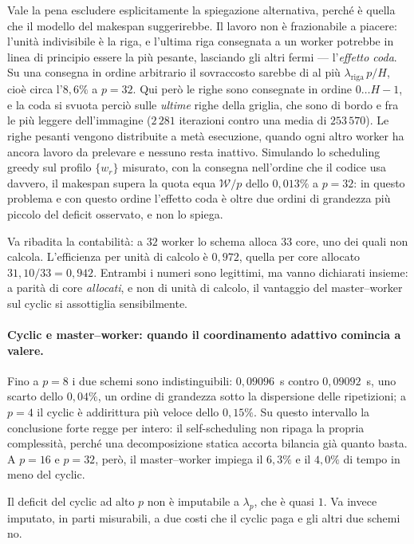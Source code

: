 Vale la pena escludere esplicitamente la spiegazione alternativa, perché è quella
che il modello del makespan suggerirebbe. Il lavoro non è frazionabile a piacere:
l'unità indivisibile è la riga, e l'ultima riga consegnata a un worker potrebbe
in linea di principio essere la più pesante, lasciando gli altri fermi ---
l'\emph{effetto coda}. Su una consegna in ordine arbitrario il sovraccosto
sarebbe di al più $\lambda_{\text{riga}}\,p/H$, cioè circa l'$8{,}6\%$ a $p=32$.
Qui però le righe sono consegnate in ordine $0 \ldots H-1$, e la coda si svuota
perciò sulle \emph{ultime} righe della griglia, che sono di bordo e fra le più
leggere dell'immagine ($2\,281$ iterazioni contro una media di $253\,570$). Le
righe pesanti vengono distribuite a metà esecuzione, quando ogni altro worker ha
ancora lavoro da prelevare e nessuno resta inattivo. Simulando lo scheduling
greedy sul profilo $\{w_r\}$ misurato, con la consegna nell'ordine che il codice
usa davvero, il makespan supera la quota equa $\mathcal{W}/p$ dello $0{,}013\%$
a $p=32$: in questo problema e con questo ordine l'effetto coda è oltre due
ordini di grandezza più piccolo del deficit osservato, e non lo spiega.

Va ribadita la contabilità: a $32$ worker lo schema alloca $33$ core, uno dei
quali non calcola. L'efficienza per unità di calcolo è $0{,}972$, quella per core
allocato $31{,}10/33 = 0{,}942$. Entrambi i numeri sono legittimi, ma vanno
dichiarati insieme: a parità di core \emph{allocati}, e non di unità di calcolo,
il vantaggio del master--worker sul cyclic si assottiglia sensibilmente.

\paragraph{Cyclic e master--worker: quando il coordinamento adattivo comincia a valere.}
Fino a $p=8$ i due schemi sono indistinguibili: $0{,}09096$~s contro
$0{,}09092$~s, uno scarto dello $0{,}04\%$, un ordine di grandezza sotto la
dispersione delle ripetizioni; a $p=4$ il cyclic è addirittura più veloce dello
$0{,}15\%$. Su questo intervallo la conclusione forte regge per intero: il
self-scheduling non ripaga la propria complessità, perché una decomposizione
statica accorta bilancia già quanto basta. A $p=16$ e $p=32$, però, il
master--worker impiega il $6{,}3\%$ e il $4{,}0\%$ di tempo in meno del cyclic.

Il deficit del cyclic ad alto $p$ non è imputabile a $\lambda_p$, che è quasi
$1$. Va invece imputato, in parti misurabili, a due costi che il cyclic paga e
gli altri due schemi no.

